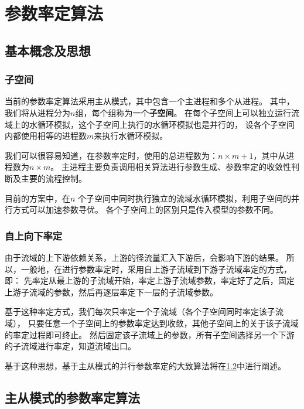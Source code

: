 \section{参数率定算法}
\subsection{基本概念及思想}
\subsubsection{子空间}
当前的参数率定算法采用主从模式，其中包含一个主进程和多个从进程。
其中，我们将从进程分为$n$组，每个组称为一个\textbf{子空间}。
在每个子空间上可以独立运行流域上的水循环模拟，这个子空间上执行的水循环模拟也是并行的，
设各个子空间内都使用相等的进程数$m$来执行水循环模拟。

我们可以很容易知道，在参数率定时，使用的总进程数为：$n\times m + 1$，其中从进程数为$n\times m$。
主进程主要负责调用相关算法进行参数生成、参数率定的收敛性判断及主要的流程控制。

目前的方案中，在$n$ 个子空间中同时执行独立的流域水循环模拟，利用子空间的并行方式可以加速参数寻优。
各个子空间上的区别只是传入模型的参数不同。

\subsubsection{自上向下率定}
由于流域的上下游依赖关系，上游的径流量汇入下游后，会影响下游的结果。
所以，一般地，在进行参数率定时，采用自上游子流域到下游子流域率定的方式，即：
先率定从最上游的子流域开始，率定上游子流域参数，率定好了之后，固定上游子流域的参数，然后再逐层率定下一层的子流域参数。

基于这种率定方式，我们每次只率定一个子流域（各个子空间同时率定该子流域），
只要任意一个子空间上的参数率定达到收敛，其他子空间上的关于该子流域的率定过程即可终止。
然后固定该子流域上的参数，所有子空间选择另一个下游的子流域进行率定，知道流域出口。

基于这种思想，基于主从模式的并行参数率定的大致算法将在\ref{algorithm}中进行阐述。

\subsection{主从模式的参数率定算法} \label{algorithm}

